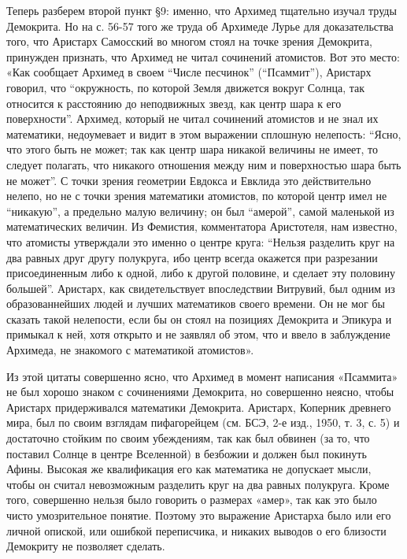 Теперь разберем второй пункт §9: именно, что Архимед тщательно
изучал труды Демокрита. Но на с. 56-57 того же труда об Архимеде Лурье
для доказательства того, что Аристарх Самосский во многом стоял на
точке зрения Демокрита, принужден признать, что Архимед не читал
сочинений атомистов. Вот это место: «Как сообщает Архимед в своем
``Числе песчинок'' (``Псаммит''), Аристарх говорил, что ``окружность,
по которой Земля движется вокруг Солнца, так относится к расстоянию до
неподвижных звезд, как центр шара к его поверхности''. Архимед,
который не читал сочинений атомистов и не знал их математики,
недоумевает и видит в этом выражении сплошную нелепость: ``Ясно, что
этого быть не может; так как центр шара никакой величины не имеет, то
следует полагать, что никакого отношения между ним и поверхностью шара
быть не может''. С точки зрения геометрии Евдокса и Евклида это
действительно нелепо, но не с точки зрения математики атомистов, по
которой центр имел не ``никакую'', а предельно малую величину; он был
``амерой'', самой маленькой из математических величин. Из Фемистия,
комментатора Аристотеля, нам известно, что атомисты утверждали это
именно о центре круга: ``Нельзя разделить круг на два равных друг
другу полукруга, ибо центр всегда окажется при разрезании
присоединенным либо к одной, либо к другой половине, и сделает эту
половину большей''. Аристарх, как свидетельствует впоследствии
Витрувий, был одним из образованнейших людей и лучших математиков
своего времени. Он не мог бы сказать такой нелепости, если бы он стоял
на позициях Демокрита и Эпикура и примыкал к ней, хотя открыто и не
заявлял об этом, что и ввело в заблуждение Архимеда, не знакомого с
математикой атомистов».

Из этой цитаты совершенно ясно, что Архимед в момент написания
«Псаммита» не был хорошо знаком с сочинениями Демокрита, но совершенно
неясно, чтобы Аристарх придерживался математики Демокрита. Аристарх,
Коперник древнего мира, был по своим взглядам пифагорейцем (см. БСЭ,
2-е изд., 1950, т. 3, с. 5) и достаточно стойким по своим убеждениям,
так как был обвинен (за то, что поставил Солнце в центре Вселенной) в
безбожии и должен был покинуть Афины. Высокая же квалификация его как
математика не допускает мысли, чтобы он считал невозможным разделить
круг на два равных полукруга. Кроме того, совершенно нельзя было
говорить о размерах «амер», так как это было чисто умозрительное
понятие. Поэтому это выражение Аристарха было или его личной опиской,
или ошибкой переписчика, и никаких выводов о его близости Демокриту не
позволяет сделать.

